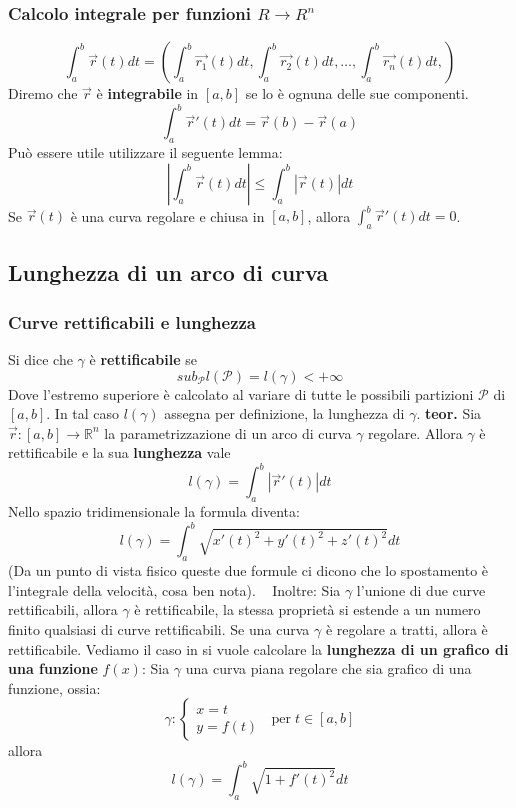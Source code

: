 \subsubsection{Calcolo integrale per funzioni $R \rightarrow R^n$}
\[
    \int_{a}^{b} \vec{r}(t) dt =\left( \int_{a}^{b}\vec{r_1}(t) dt,\int_{a}^{b}\vec{r_2}(t) dt, \dots, \int_{a}^{b}\vec{r_n}(t) dt,\right)
\]
Diremo che $\vec{r}$ è \textbf{integrabile} in $[a,b]$ se lo è ognuna delle sue componenti.\newline
\[
    \int_{a}^{b} \vec{r}'(t) dt = \vec{r}(b) - \vec{r}(a)
\]
Può essere utile utilizzare il seguente lemma:
\[
    \left| \int_{a}^{b}\vec{r}(t)dt \right| \leq \int_{a}^{b}|\vec{r}(t)|dt
\]
Se $\vec{r}(t)$ è una curva regolare e chiusa in $[a,b]$, allora $\int_{a}^{b}\vec{r}'(t) dt =0$.
\subsection{Lunghezza di un arco di curva}
\subsubsection{Curve rettificabili e lunghezza}
Si dice che $\gamma$ è \textbf{rettificabile} se 
\[
    sub_\mathcal{P} l(\mathcal{P}) = l(\gamma) < + \infty
\]
Dove l'estremo superiore è calcolato al variare di tutte le possibili partizioni $\mathcal{P}$ di $[a,b]$.\newline
In tal caso $l(\gamma)$ assegna per definizione, la lunghezza di $\gamma$.\newline
\newline
\textbf{teor.} Sia $\vec{r}:[a,b] \rightarrow \mathbb{R}^n$ la parametrizzazione di un arco di curva $\gamma$ regolare. Allora $\gamma$ è rettificabile e la sua \textbf{lunghezza} vale 
\[
    l(\gamma) = \int_{a}^{b}|\vec{r}'(t)| dt
\]
Nello spazio tridimensionale la formula diventa:
\[
    l(\gamma)= \int_{a}^{b}\sqrt{x'(t)^2 + y'(t)^2 + z'(t)^2}dt
\]
(Da un punto di vista fisico queste due formule ci dicono che lo spostamento è l'integrale della velocità, cosa ben nota).
\ \newline
Inoltre:\newline
Sia $\gamma$ l'unione di due curve rettificabili, allora $\gamma$ è rettificabile, la stessa proprietà si estende a un numero finito qualsiasi di curve rettificabili. \newline
Se una curva $\gamma$ è regolare a tratti, allora è rettificabile.\newline
\newline
Vediamo il caso in si vuole calcolare la \textbf{lunghezza di un grafico di una funzione} $f(x)$:\newline
Sia $\gamma$ una curva piana regolare che sia grafico di una funzione, ossia:
\[
    \gamma : \begin{cases}
        x =t \\
        y= f(t)
    \end{cases} \;\; \text{per} \;t \in[a,b]
\]
allora
\[
    l(\gamma) = \int_{a}^{b}\sqrt{1+f'(t)^2}dt
\]
